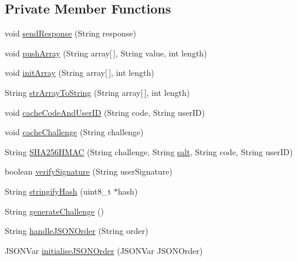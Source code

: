 \subsection*{Private Member Functions}
\begin{DoxyCompactItemize}
\item 
void \mbox{\hyperlink{class_bollard_controller_class_a980b5b76c8c3776b54f3906c4cc623d9}{send\+Response}} (String response)
\item 
void \mbox{\hyperlink{class_bollard_controller_class_a20ba08d7a3efdadd4a70b7fcd03644d3}{push\+Array}} (String array\mbox{[}$\,$\mbox{]}, String value, int length)
\item 
void \mbox{\hyperlink{class_bollard_controller_class_a1e15c0f5b739be3830dc0700842e117e}{init\+Array}} (String array\mbox{[}$\,$\mbox{]}, int length)
\item 
String \mbox{\hyperlink{class_bollard_controller_class_a81e1b88bbc03b8b8d228b07e58e25672}{str\+Array\+To\+String}} (String array\mbox{[}$\,$\mbox{]}, int length)
\item 
void \mbox{\hyperlink{class_bollard_controller_class_a129eac34669458631c2c235c9c01a2fb}{cache\+Code\+And\+User\+ID}} (String code, String user\+ID)
\item 
void \mbox{\hyperlink{class_bollard_controller_class_a12b211bbbaf0ef839aba053b48bb990e}{cache\+Challenge}} (String challenge)
\item 
String \mbox{\hyperlink{class_bollard_controller_class_ad4b7da78d49f5bf2922b30912283adf5}{S\+H\+A256\+H\+M\+AC}} (String challenge, String \mbox{\hyperlink{class_bollard_controller_class_a00641ae780ce3476dbd3ed2c2c4f097a}{salt}}, String code, String user\+ID)
\item 
boolean \mbox{\hyperlink{class_bollard_controller_class_ab543ba0b273413dfa896902e6a9855ee}{verify\+Signature}} (String user\+Signature)
\item 
String \mbox{\hyperlink{class_bollard_controller_class_a909392fb23d4fd17ca8f59dd4bbcbec1}{stringify\+Hash}} (uint8\+\_\+t $\ast$hash)
\item 
String \mbox{\hyperlink{class_bollard_controller_class_a7463ffa0ae3c7f4a34ee18d06d158be4}{generate\+Challenge}} ()
\item 
String \mbox{\hyperlink{class_bollard_controller_class_a1873a12a6d76aac6d952a08029f3eccd}{handle\+J\+S\+O\+N\+Order}} (String order)
\item 
J\+S\+O\+N\+Var \mbox{\hyperlink{class_bollard_controller_class_ab9fd9904294e6b21de58a49b901a5aee}{initialise\+J\+S\+O\+N\+Order}} (J\+S\+O\+N\+Var J\+S\+O\+N\+Order)

\end{DoxyCompactItemize}
